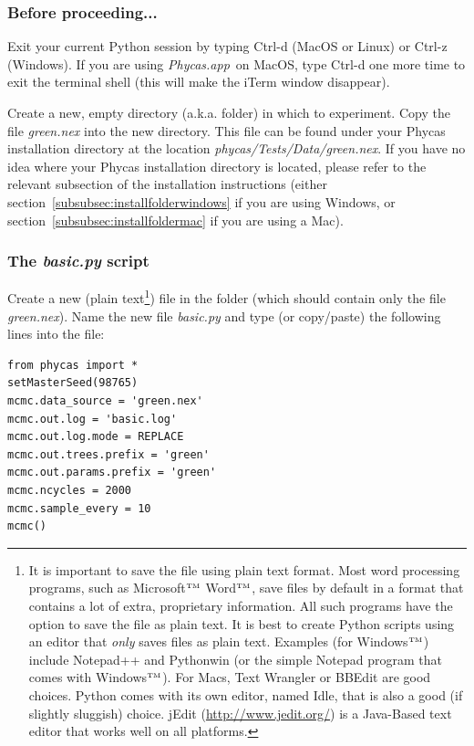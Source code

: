 \documentclass[10pt]{article}
\newcommand{\trademark}[1]{#1${}^{\mbox{\tiny TM}}$}
\newcommand{\pathname}[1]{{\em #1}}				%
\newcommand{\keycmd}[1]{{\sf #1}}					%
\newcommand{\phycasapp}{\pathname{Phycas.app}}
\begin{document}
\subsubsection{Before proceeding...}
Exit your current Python session by typing \keycmd{Ctrl-d} (MacOS or Linux) or \keycmd{Ctrl-z} (Windows). If you are using \phycasapp\ on MacOS, type \keycmd{Ctrl-d} one more time to exit the terminal shell (this will make the iTerm window disappear). 

Create a new, empty directory (a.k.a. folder) in which to experiment. Copy the file \pathname{green.nex} into the new directory. This file can be found under your Phycas installation directory at the location \pathname{phycas/Tests/Data/green.nex}. If you have no idea where your Phycas installation directory is located, please refer to the relevant subsection of the installation instructions (either section~\ref{subsubsec:installfolderwindows} if you are using Windows, or section~\ref{subsubsec:installfoldermac} if you are using a Mac).

\subsubsection{The {\em basic.py} script}
Create a new (plain text\footnote{It is important to save the file using plain text format. Most word processing programs, such as \trademark{Microsoft} \trademark{Word}, save files by default in a format that contains a lot of extra, proprietary information. All such programs have the option to save the file as plain text. It is best to create Python scripts using an editor that {\em only} saves files as plain text. Examples (for \trademark{Windows}) include Notepad++ and Pythonwin (or the simple Notepad program that comes with \trademark{Windows}). For Macs, Text Wrangler or BBEdit are good choices. Python comes with its own editor, named Idle, that is also a good (if slightly sluggish) choice. jEdit (\url{http://www.jedit.org/}) is a Java-Based text editor that works well on all platforms.}) file in the folder (which should contain only the file \pathname{green.nex}). Name the new file \pathname{basic.py} and type (or copy/paste) the following lines into the file:
\begin{verbatim}
from phycas import *
setMasterSeed(98765)
mcmc.data_source = 'green.nex'
mcmc.out.log = 'basic.log'
mcmc.out.log.mode = REPLACE
mcmc.out.trees.prefix = 'green'
mcmc.out.params.prefix = 'green'
mcmc.ncycles = 2000
mcmc.sample_every = 10
mcmc()
\end{verbatim}
\end{document}
